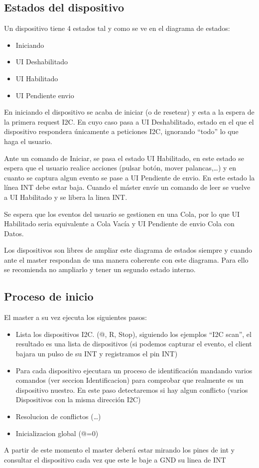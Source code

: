 \subsection{Estados del dispositivo}
Un dispositivo tiene 4 estados tal y como se ve en el diagrama de estados:
\begin{itemize}
    \item Iniciando
    \item UI Deshabilitado
    \item UI Habilitado
    \item UI Pendiente envio
\end{itemize}
En iniciando el dispositivo se acaba de iniciar (o de resetear) y esta a la espera de la primera request I2C.
En cuyo caso pasa a UI Deshabilitado, estado en el que el dispositivo respondera únicamente a peticiones I2C,
ignorando “todo” lo que haga el usuario.

Ante un comando de Iniciar, se pasa el estado UI Habilitado, en este estado se espera que el usuario realice
acciones (pulsar botón, mover palancas,…) y en cuanto se captura algun evento se pase a UI Pendiente de envio.
En este estado la línea INT debe estar baja. Cuando el máster envíe un comando de leer se vuelve a UI Habilitado
y se libera la linea INT.

Se espera que los eventos del usuario se gestionen en una Cola, por lo que UI Habilitado seria equivalente a
Cola Vacía  y UI Pendiente de envio Cola con Datos.

Los dispositivos son libres de ampliar este diagrama de estados siempre y cuando ante el master respondan de
una manera coherente con este diagrama. Para ello se recomienda no ampliarlo y tener un segundo estado interno.

\subsection{Proceso de inicio}
El master a su vez ejecuta los siguientes pasos:
\begin{itemize}
    \item Lista los dispositivos I2C. (@, R, Stop), siguiendo los ejemplos “I2C scan”, el resultado es una lista
    de dispositivos (si podemos capturar el evento, el client bajara un pulso de su INT y registramos el pin INT)
    \item Para cada dispositivo ejecutara un proceso de identificación mandando varios comandos (ver seccion
    Identificacion) para comprobar que realmente es un dispositivo nuestro. En este
    paso detectaremos si hay algun conflicto (varios Dispositivos con la misma dirección I2C) 
    \item Resolucion de conflictos (…)
    \item Inicializacion global (@=0)
\end{itemize}
A partir de este momento el master deberá estar mirando los pines de int y consultar el dispositivo cada vez que
este le baje a GND su linea de INT


